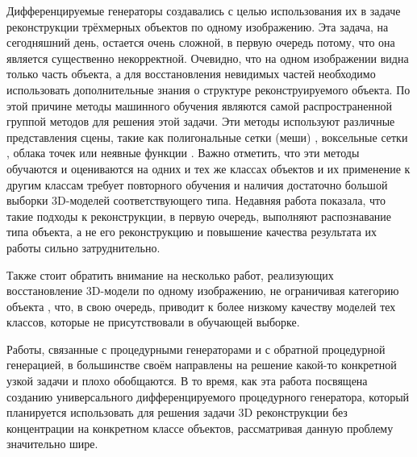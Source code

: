 \documentclass[a4paper,hidelinks,12pt]{article}
\begin{document}
\par
Дифференцируемые генераторы создавались с целью использования их в задаче реконструкции трёхмерных объектов по одному изображению. Эта задача, на сегодняшний день, остается очень сложной, в первую очередь потому, что она является существенно некорректной. Очевидно, что на одном изображении видна только часть объекта, а для восстановления невидимых частей необходимо использовать дополнительные знания о структуре реконструируемого объекта. По этой причине методы машинного обучения являются самой распространенной группой методов для решения этой задачи. Эти методы используют различные представления сцены, такие как полигональные сетки (меши) \cite{wang2018pixel2mesh} \cite{nie2020total3dunderstanding} \cite{ye2021shelf}, воксельные сетки \cite{choy20163d} \cite{popov2020corenet}, облака точек \cite{fan2017point} \cite{chen2021unsupervised} или неявные функции \cite{chen2019learning}. Важно отметить, что эти методы обучаются и оцениваются на одних и тех же классах объектов и их применение к другим классам требует повторного обучения и наличия достаточно большой выборки 3D-моделей соответствующего типа. Недавняя работа \cite{tatarchenko2019single} показала, что такие подходы к реконструкции, в первую очередь, выполняют распознавание типа объекта, а не его реконструкцию и повышение качества результата их работы сильно затруднительно.
\par
Также стоит обратить внимание на несколько работ, реализующих восстановление 3D-модели по одному изображению, не ограничивая категорию объекта \cite{zhang2018learning} \cite{yang2022zeromesh}, что, в свою очередь, приводит к более низкому качеству моделей тех классов, которые не присутствовали в обучающей выборке.\\
\par
Работы, связанные с процедурными генераторами и с обратной процедурной генерацией, в большинстве своём направлены на решение какой-то конкретной узкой задачи и плохо обобщаются. В то время, как эта работа посвящена созданию универсального дифференцируемого процедурного генератора, который планируется использовать для решения задачи 3D реконструкции без концентрации на конкретном классе объектов, рассматривая данную проблему значительно шире.
\end{document}
